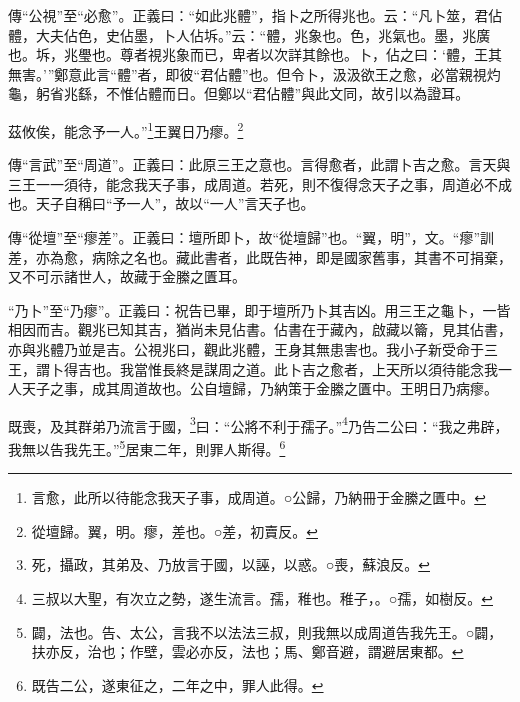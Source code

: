 {\noindent\zhuan{}\fzbyks 傳“公視”至“必愈”。正義曰：“如此兆體”，指卜之所得兆也。云：“凡卜筮，君佔體，大夫佔色，史佔墨，卜人佔坼。”云：“體，兆象也。色，兆氣也。墨，兆廣也。坼，兆璺也。尊者視兆象而已，卑者以次詳其餘也。卜，佔之曰：‘體，王其無害。’”鄭意此言“體”者，即彼“君佔體”也。但令卜，汲汲欲王之愈，必當親視灼龜，躬省兆繇，不惟佔體而日。但鄭以“君佔體”與此文同，故引以為證耳。 \par}

茲攸俟，能念予一人。”\footnote{言愈，此所以待能念我天子事，成周道。○公歸，乃納冊于金縢之匱中。}王翼日乃瘳。\footnote{從壇歸。翼，明。瘳，差也。○差，初賣反。}

{\noindent\zhuan{}\fzbyks 傳“言武”至“周道”。正義曰：此原三王之意也。言得愈者，此謂卜吉之愈。言天與三王一一須待，能念我天子事，成周道。若死，則不復得念天子之事，周道必不成也。天子自稱曰“予一人”，故以“一人”言天子也。 \par}

{\noindent\zhuan{}\fzbyks 傳“從壇”至“瘳差”。正義曰：壇所即卜，故“從壇歸”也。“翼，明”，文。“瘳”訓差，亦為愈，病除之名也。藏此書者，此既告神，即是國家舊事，其書不可捐棄，又不可示諸世人，故藏于金縢之匱耳。 \par}

{\noindent\shu{}\fzkt “乃卜”至“乃瘳”。正義曰：祝告已畢，即于壇所乃卜其吉凶。用三王之龜卜，一皆相因而吉。觀兆已知其吉，猶尚未見佔書。佔書在于藏內，啟藏以籥，見其佔書，亦與兆體乃並是吉。公視兆曰，觀此兆體，王身其無患害也。我小子新受命于三王，謂卜得吉也。我當惟長終是謀周之道。此卜吉之愈者，上天所以須待能念我一人天子之事，成其周道故也。公自壇歸，乃納策于金縢之匱中。王明日乃病瘳。 \par}

既喪，及其群弟乃流言于國，\footnote{死，攝政，其弟及、乃放言于國，以誣，以惑。○喪，蘇浪反。}曰：“公將不利于孺子。”\footnote{三叔以大聖，有次立之勢，遂生流言。孺，稚也。稚子，。○孺，如樹反。}乃告二公曰：“我之弗辟，我無以告我先王。”\footnote{闢，法也。告、太公，言我不以法法三叔，則我無以成周道告我先王。○闢，扶亦反，治也；作壁，雲必亦反，法也；馬、鄭音避，謂避居東都。}居東二年，則罪人斯得。\footnote{既告二公，遂東征之，二年之中，罪人此得。}


